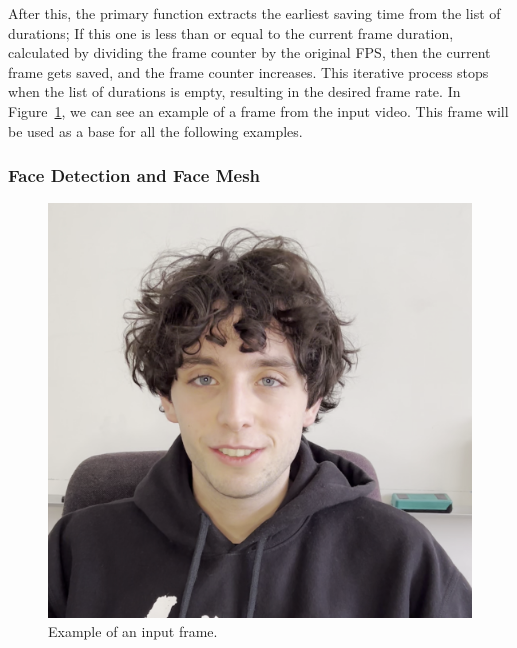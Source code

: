 \documentclass[preprint]{elsarticle}
\begin{document}
After this, the primary function extracts the earliest saving time from the list of durations; 
If this one is less than or equal to the current frame duration, calculated by dividing the frame counter by the original FPS,  then the current frame gets saved, and the frame counter increases. This iterative process stops when the list of durations is empty, resulting in the desired frame rate. In Figure~\ref{fig:init-frame}, we can see an example of a frame from the input video. This frame will be used as a base for all the following examples.



\subsubsection{Face Detection and Face Mesh}\label{sec:face_detection}

\begin{figure}[t]
	\centering
	\includegraphics[scale=0.18, keepaspectratio]{img/project_img/init.png}
	\caption{Example of an input frame.}\label{fig:init-frame}
\end{figure}
\end{document}

